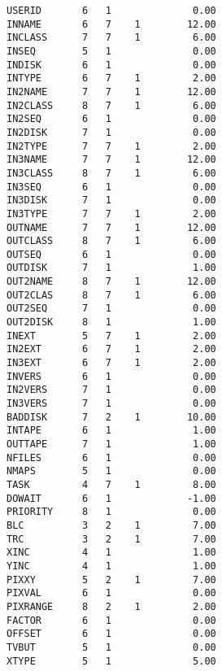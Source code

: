 \begin{verbatim}
USERID       6   1              0.00
INNAME       6   7    1        12.00
INCLASS      7   7    1         6.00
INSEQ        5   1              0.00
INDISK       6   1              0.00
INTYPE       6   7    1         2.00
IN2NAME      7   7    1        12.00
IN2CLASS     8   7    1         6.00
IN2SEQ       6   1              0.00
IN2DISK      7   1              0.00
IN2TYPE      7   7    1         2.00
IN3NAME      7   7    1        12.00
IN3CLASS     8   7    1         6.00
IN3SEQ       6   1              0.00
IN3DISK      7   1              0.00
IN3TYPE      7   7    1         2.00
OUTNAME      7   7    1        12.00
OUTCLASS     8   7    1         6.00
OUTSEQ       6   1              0.00
OUTDISK      7   1              1.00
OUT2NAME     8   7    1        12.00
OUT2CLAS     8   7    1         6.00
OUT2SEQ      7   1              0.00
OUT2DISK     8   1              1.00
INEXT        5   7    1         2.00
IN2EXT       6   7    1         2.00
IN3EXT       6   7    1         2.00
INVERS       6   1              0.00
IN2VERS      7   1              0.00
IN3VERS      7   1              0.00
BADDISK      7   2    1        10.00
INTAPE       6   1              1.00
OUTTAPE      7   1              1.00
NFILES       6   1              0.00
NMAPS        5   1              0.00
TASK         4   7    1         8.00
DOWAIT       6   1             -1.00
PRIORITY     8   1              0.00
BLC          3   2    1         7.00
TRC          3   2    1         7.00
XINC         4   1              1.00
YINC         4   1              1.00
PIXXY        5   2    1         7.00
PIXVAL       6   1              0.00
PIXRANGE     8   2    1         2.00
FACTOR       6   1              0.00
OFFSET       6   1              0.00
TVBUT        5   1              0.00
XTYPE        5   1              5.00
\end{verbatim}
